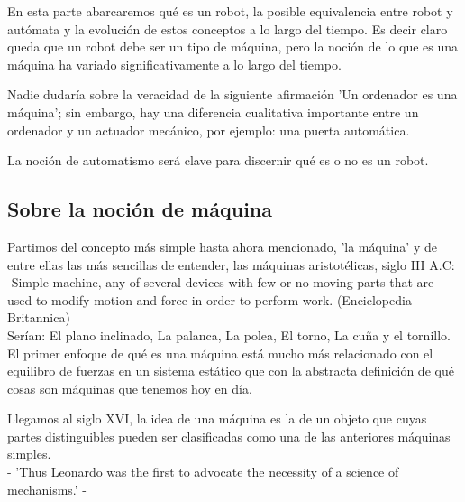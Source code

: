 


En esta parte abarcaremos qué es un robot, la posible equivalencia entre robot y autómata y la evolución de estos conceptos a lo largo del tiempo. Es decir claro queda que un robot debe ser un tipo de máquina, pero la noción de lo que es una máquina ha variado significativamente a lo largo del tiempo. 

\vspace{10px}

Nadie dudaría sobre la veracidad de la siguiente afirmación 'Un ordenador es una máquina'; sin embargo, hay una diferencia cualitativa importante entre un ordenador y un actuador mecánico, por ejemplo: una puerta automática.

\vspace{10px}

La noción de automatismo será clave para discernir qué es o no es un robot. 

\vspace{10px}

\subsection{Sobre la noción de máquina}


Partimos del concepto más simple hasta ahora mencionado, 'la máquina' y de entre ellas las más sencillas de entender, las máquinas aristotélicas, siglo III A.C: \\

-Simple machine, any of several devices with few or no moving parts that are used to modify motion and force in order to perform work. (Enciclopedia Britannica) \\


Serían: El plano inclinado, La palanca, La polea, El torno, La cuña y el tornillo. El primer enfoque de qué es una máquina está mucho más relacionado con el equilibro de fuerzas en un sistema estático que con la abstracta definición de qué cosas son máquinas que tenemos hoy en día. 

\vspace{10px}

Llegamos al siglo XVI, la idea de una máquina es la de un objeto que cuyas partes distinguibles pueden ser clasificadas como una de las anteriores máquinas simples. \\

- 'Thus Leonardo was the first to advocate the necessity of a science of mechanisms.' -  \\

